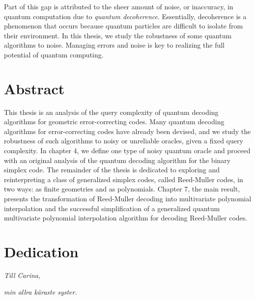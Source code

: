 \documentclass[12pt,twoside]{reedthesis}
\theoremstyle{definition}
\begin{document}
Part of this gap is attributed to the sheer amount of noise, or inaccuracy, in  quantum computation due to \emph{quantum decoherence}. Essentially, decoherence is a phenomenon that occurs because quantum particles are difficult to isolate from their environment. In this thesis, we study the robustness of some quantum algorithms to noise. Managing errors and noise is key to realizing the full potential of quantum computing.
 
 

    \tableofcontents

  \chapter*{Abstract}
This thesis is an analysis of the query complexity of quantum decoding algorithms for geometric error-correcting codes. Many quantum decoding algorithms for error-correcting codes have already been devised, and we study the robustness of such algorithms to noisy or unreliable oracles, given a fixed query complexity. In chapter 4, we define one type of noisy quantum oracle and proceed with an original analysis of the quantum decoding algorithm for the binary simplex code. The remainder of the thesis is dedicated to exploring and reinterpreting a class of generalized simplex codes, called Reed-Muller codes, in two ways: as finite geometries and as polynomials. Chapter 7, the main result, presents the transformation of Reed-Muller decoding into multivariate polynomial interpolation and the  successful simplification of a generalized quantum multivariate polynomial interpolation algorithm for decoding Reed-Muller codes. 


\chapter*{Dedication}
\textit{Till Carina,} 

\textit{min allra k\"{a}raste syster.}


  \mainmatter %
  \pagestyle{fancyplain} %

\end{document}
